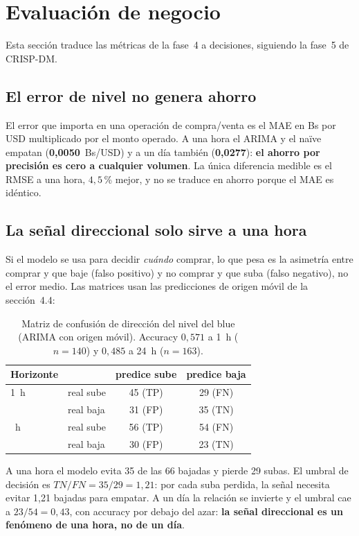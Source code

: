 \section{Evaluación de negocio}
\label{sec:negocio_eval}

Esta sección traduce las métricas de la fase~4 a decisiones, siguiendo la fase~5
de CRISP-DM.

\subsection{El error de nivel no genera ahorro}

El error que importa en una operación de compra/venta es el MAE en Bs por USD
multiplicado por el monto operado. A una hora el ARIMA y el naïve empatan
(\textbf{0{,}0050}~Bs/USD) y a un día también (\textbf{0{,}0277}): \textbf{el
ahorro por precisión es cero a cualquier volumen}. La única diferencia medible
es el RMSE a una hora, $4{,}5$\,\% mejor, y no se traduce en ahorro porque el
MAE es idéntico.

\subsection{La señal direccional solo sirve a una hora}

Si el modelo se usa para decidir \emph{cuándo} comprar, lo que pesa es la
asimetría entre comprar y que baje (falso positivo) y no comprar y que suba
(falso negativo), no el error medio. Las matrices usan las predicciones de origen
móvil de la sección~4.4:

\begin{table}[!ht]
\centering\small
\begin{tabular}{@{}llcc@{}}
\toprule
Horizonte & & predice sube & predice baja \\
\midrule
1~h  & real sube & 45 (TP) & 29 (FN) \\
     & real baja & 31 (FP) & 35 (TN) \\
\addlinespace
24~h & real sube & 56 (TP) & 54 (FN) \\
     & real baja & 30 (FP) & 23 (TN) \\
\bottomrule
\end{tabular}
\caption{Matriz de confusión de dirección del nivel del blue (ARIMA con origen
móvil). Accuracy $0{,}571$ a 1~h ($n=140$) y $0{,}485$ a 24~h ($n=163$).}
\label{tab:matriz_direccion}
\end{table}

A una hora el modelo evita 35 de las 66 bajadas y pierde 29 subas. El umbral
de decisión es $TN/FN = 35/29 = 1{,}21$: por cada suba perdida, la señal
necesita evitar 1{,}21 bajadas para empatar. A un día la relación se invierte
y el umbral cae a $23/54 = 0{,}43$, con accuracy por debajo del azar:
\textbf{la señal direccional es un fenómeno de una hora, no de un día}.

